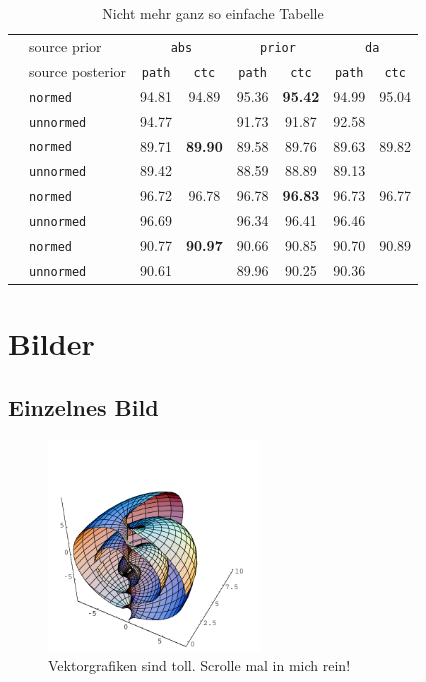 \documentclass[12pt,DIV=15,BCOR=15mm,twoside,headsepline,abstract=true,listof=totoc,bibliography=totoc]{scrreprt}
\theoremstyle{remark}	%
\begin{document}
\begin{table}[ht]
\caption{Nicht mehr ganz so einfache Tabelle}\label{tab:dlv_restr_all}
\centering
 \begin{tabular}{llcccccc}
  \hline\noalign{\smallskip}
  	&source prior				&\multicolumn{2}{c}{\texttt{abs}}&\multicolumn{2}{c}{\texttt{prior}} & \multicolumn{2}{c}{\texttt{da}}\\	
	&source posterior 			&\texttt{path}&	\texttt{ctc}&   \texttt{path}&	\texttt{ctc}&\texttt{path}&\texttt{ctc}\\
	\noalign{\smallskip}
	\hline
	\noalign{\smallskip}
	\multirow{ 2}{*}{gAP}	&\texttt{normed}	&94.81&	94.89&	95.36&	\textbf{95.42}&	94.99&	95.04\\
				&\texttt{unnormed}	&94.77&	&	91.73&	91.87&	92.58&	\\%
	\noalign{\smallskip}
	\multirow{ 2}{*}{mAP}	&\texttt{normed}	&89.71&	\textbf{89.90}&	89.58&  89.76&	89.63&89.82	\\
				&\texttt{unnormed}	&89.42&	&	88.59&	88.89&	89.13&	\\
	\noalign{\smallskip}
	\multirow{ 2}{*}{gNDCG}	&\texttt{normed}	&96.72&	96.78&	96.78&	\textbf{96.83}&	96.73&96.77	\\
				&\texttt{unnormed}	&96.69&	&	96.34&	96.41&	96.46	&\\
	\noalign{\smallskip}
	\multirow{ 2}{*}{mNDCG}	&\texttt{normed}	&90.77&	\textbf{90.97}&	90.66&  90.85&	90.70&90.89 \\
				&\texttt{unnormed}	&90.61&	&	89.96&	90.25&	90.36& \\	
	\hline
 \end{tabular}
\end{table}



\section{Bilder}
\subsection{Einzelnes Bild}
\begin{figure}[ht]
\centering
\includegraphics[width=0.5\textwidth]{pics/SCHNECKE}
\caption{Vektorgrafiken sind toll. Scrolle mal in mich rein!}
\label{fig:schnecke}
\end{figure}
\end{document}
